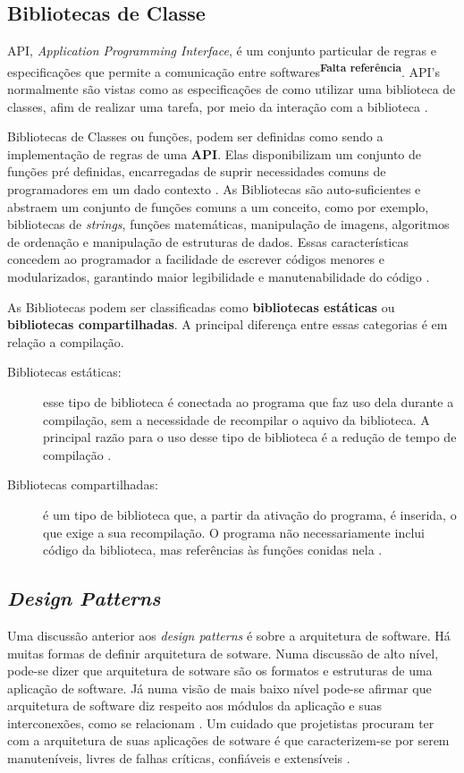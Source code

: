 \subsection{Bibliotecas de Classe}
API, \textit{Application Programming Interface}, é um conjunto particular de regras e especificações que permite a comunicação entre  softwares\textsuperscript{\textbf{Falta referência}}. API's normalmente são vistas como as especificações de como utilizar uma biblioteca de classes, afim de realizar uma tarefa, por meio da interação com a biblioteca \cite{simsek2004}.
\par
\indent Bibliotecas de Classes ou funções, podem ser definidas como sendo a implementação de regras de uma \textbf{API}. Elas disponibilizam um conjunto de funções pré definidas, encarregadas de suprir necessidades comuns de programadores em um dado contexto \cite{simsek2004}. As Bibliotecas são auto-suficientes e abstraem um conjunto de funções comuns a um conceito, como por exemplo, bibliotecas de \textit{strings}, funções matemáticas, manipulação de imagens, algoritmos de ordenação e manipulação de estruturas de dados. Essas características concedem ao programador a facilidade de escrever códigos menores e modularizados, garantindo maior legibilidade e manutenabilidade do código \cite{simsek2004}.
\par
\indent As Bibliotecas podem ser classificadas como \textbf{bibliotecas estáticas} ou \textbf{bibliotecas compartilhadas}. A principal diferença entre essas categorias é em relação a compilação.
\begin{description}
\item[Bibliotecas estáticas:] esse tipo de biblioteca é conectada ao programa que faz uso dela durante a compilação, sem a necessidade de recompilar o aquivo da biblioteca. A principal razão para o uso desse tipo de biblioteca é a redução de tempo de compilação \cite{simsek2004}.
\item[Bibliotecas compartilhadas:] é um tipo de biblioteca que, a partir da ativação do programa, é inserida, o que exige a sua recompilação. O programa não necessariamente inclui código da biblioteca, mas referências às funções conidas nela \cite{simsek2004}.
\end{description}

\subsection{\textit{Design Patterns}}
Uma discussão anterior aos \textit{design patterns} é sobre a arquitetura de software. Há muitas formas de definir arquitetura de sotware. Numa discussão de alto nível, pode-se dizer que arquitetura de sotware são os formatos e estruturas de uma aplicação de software. Já numa visão de mais baixo nível pode-se afirmar que arquitetura de software diz respeito aos módulos da aplicação e suas interconexões, como se relacionam \cite{martin2000}. Um cuidado que projetistas procuram ter com a arquitetura de suas aplicações de sotware é que caracterizem-se por serem manuteníveis, livres de falhas críticas, confiáveis e extensíveis \cite{kleinWeiss2009}.

